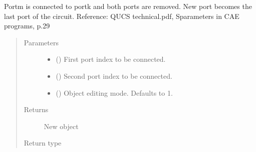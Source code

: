 \documentclass[letterpaper,10pt,english]{sphinxmanual}
\begin{document}
\begin{fulllineitems}

\begin{fulllineitems}
\label{\detokenize{touchstone:touchstone.spfile.connect_2_ports_retain}}
Port\sphinxhyphen{}m is connected to port\sphinxhyphen{}k and both ports are removed. New port becomes the last port of the circuit.
Reference: QUCS technical.pdf, S\sphinxhyphen{}parameters in CAE programs, p.29
\begin{quote}\begin{description}
\item[{Parameters}] \leavevmode\begin{itemize}
\item {} 
 () \textendash{} First port index to be connected.

\item {} 
 () \textendash{} Second port index to be connected.

\item {} 
 (\sphinxstyleliteralemphasis{\sphinxupquote{, }}) \textendash{} Object editing mode. Defaults to \sphinxhyphen{}1.

\end{itemize}

\item[{Returns}] \leavevmode
New  object

\item[{Return type}] \leavevmode
{\hyperref[\detokenize{touchstone:touchstone.spfile}]{}}

\end{description}\end{quote}

\end{fulllineitems}



\end{fulllineitems}
\end{document}
